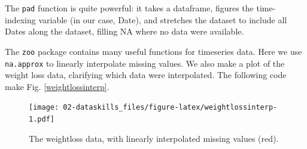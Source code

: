 \documentclass[]{book}
\newenvironment{Shaded}{\begin{snugshade}}{\end{snugshade}}
\newcommand{\CommentTok}[1]{\textcolor[rgb]{0.56,0.35,0.01}{\textit{#1}}}
\newcommand{\DataTypeTok}[1]{\textcolor[rgb]{0.13,0.29,0.53}{#1}}
\newcommand{\FloatTok}[1]{\textcolor[rgb]{0.00,0.00,0.81}{#1}}
\newcommand{\KeywordTok}[1]{\textcolor[rgb]{0.13,0.29,0.53}{\textbf{#1}}}
\newcommand{\NormalTok}[1]{#1}
\newcommand{\OperatorTok}[1]{\textcolor[rgb]{0.81,0.36,0.00}{\textbf{#1}}}
\newcommand{\StringTok}[1]{\textcolor[rgb]{0.31,0.60,0.02}{#1}}
\begin{document}
The \texttt{pad} function is quite powerful: it takes a dataframe, figures the time-indexing variable (in our case, Date), and stretches the dataset to include all Dates along the dataset, filling NA where no data were available.

The \texttt{zoo} package contains many useful functions for timeseries data. Here we use \texttt{na.approx} to linearly interpolate missing values. We also make a plot of the weight loss data, clarifying which data were interpolated. The following code make Fig. \ref{weightlossinterp}.

\begin{Shaded}
\end{Shaded}

\begin{figure}
\centering
\texttt{[image: 02-dataskills\_files/figure-latex/weightlossinterp-1.pdf]}
\caption{\label{fig:weightlossinterp}The weightloss data, with linearly interpolated missing values (red).}
\end{figure}
\end{document}
